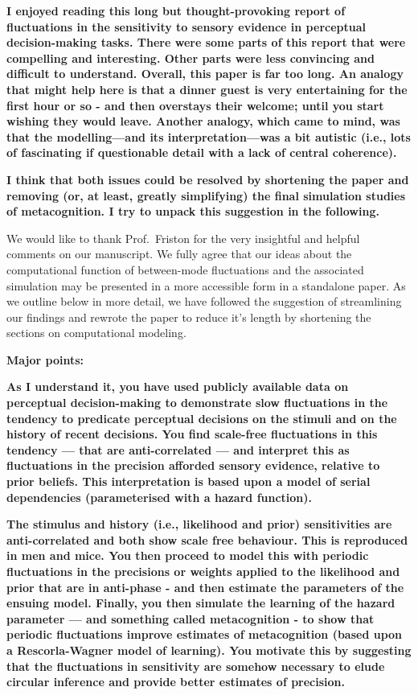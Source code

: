 \documentclass[
]{article}
\begin{document}
\textbf{I enjoyed reading this long but thought-provoking report of
fluctuations in the sensitivity to sensory evidence in perceptual
decision-making tasks. There were some parts of this report that were
compelling and interesting. Other parts were less convincing and
difficult to understand. Overall, this paper is far too long. An analogy
that might help here is that a dinner guest is very entertaining for the
first hour or so - and then overstays their welcome; until you start
wishing they would leave. Another analogy, which came to mind, was that
the modelling---and its interpretation---was a bit autistic (i.e., lots
of fascinating if questionable detail with a lack of central
coherence).}

\textbf{I think that both issues could be resolved by shortening the
paper and removing (or, at least, greatly simplifying) the final
simulation studies of metacognition. I try to unpack this suggestion in
the following.}

We would like to thank Prof.~Friston for the very insightful and helpful
comments on our manuscript. We fully agree that our ideas about the
computational function of between-mode fluctuations and the associated
simulation may be presented in a more accessible form in a standalone
paper. As we outline below in more detail, we have followed the
suggestion of streamlining our findings and rewrote the paper to reduce
it's length by shortening the sections on computational modeling.

\textbf{Major points:}

\textbf{As I understand it, you have used publicly available data on
perceptual decision-making to demonstrate slow fluctuations in the
tendency to predicate perceptual decisions on the stimuli and on the
history of recent decisions. You find scale-free fluctuations in this
tendency --- that are anti-correlated --- and interpret this as
fluctuations in the precision afforded sensory evidence, relative to
prior beliefs. This interpretation is based upon a model of serial
dependencies (parameterised with a hazard function).}

\textbf{The stimulus and history (i.e., likelihood and prior)
sensitivities are anti-correlated and both show scale free behaviour.
This is reproduced in men and mice. You then proceed to model this with
periodic fluctuations in the precisions or weights applied to the
likelihood and prior that are in anti-phase - and then estimate the
parameters of the ensuing model. Finally, you then simulate the learning
of the hazard parameter --- and something called metacognition - to show
that periodic fluctuations improve estimates of metacognition (based
upon a Rescorla-Wagner model of learning). You motivate this by
suggesting that the fluctuations in sensitivity are somehow necessary to
elude circular inference and provide better estimates of precision.}
\end{document}
